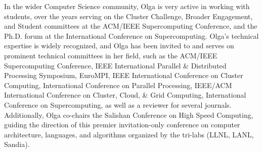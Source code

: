 \documentclass[11pt]{article}
\begin{document}
%
%

In the wider Computer Science community, Olga is very active in working with students,
over the years serving on the Cluster Challenge, Broader Engagement, and Student committees at
the ACM/IEEE Supercomputing Conference,
and the Ph.D. forum at the International Conference on Supercomputing.
%
Olga's technical expertise is widely recognized, and Olga has been invited to and serves on
prominent technical committees in her field, such as
the ACM/IEEE Supercomputing Conference,
IEEE International Parallel \& Distributed Processing Symposium,
EuroMPI, IEEE International Conference on Cluster Computing,
International Conference on Parallel Processing,
IEEE/ACM International Conference on Cluster, Cloud, \& Grid Computing,
International Conference on Supercomputing,
as well as a reviewer for several journals.
%
Additionally, Olga co-chairs the
Salishan Conference on High Speed Computing,
guiding the direction of this premier invitation-only conference
on computer architecture, languages, and algorithms organized by the tri-labs (LLNL, LANL, Sandia).








\end{document}

